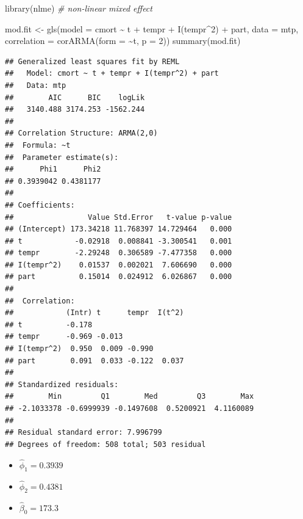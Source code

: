 \documentclass[
]{book}
\newenvironment{Shaded}{\begin{snugshade}}{\end{snugshade}}
\newcommand{\AttributeTok}[1]{\textcolor[rgb]{0.77,0.63,0.00}{#1}}
\newcommand{\CommentTok}[1]{\textcolor[rgb]{0.56,0.35,0.01}{\textit{#1}}}
\newcommand{\DecValTok}[1]{\textcolor[rgb]{0.00,0.00,0.81}{#1}}
\newcommand{\FunctionTok}[1]{\textcolor[rgb]{0.00,0.00,0.00}{#1}}
\newcommand{\NormalTok}[1]{#1}
\newcommand{\OtherTok}[1]{\textcolor[rgb]{0.56,0.35,0.01}{#1}}
\newcommand{\SpecialCharTok}[1]{\textcolor[rgb]{0.00,0.00,0.00}{#1}}
\theoremstyle{definition}
\theoremstyle{definition}
\theoremstyle{definition}
\theoremstyle{definition}
\theoremstyle{remark}
\begin{document}
\begin{Shaded}
\begin{Highlighting}[]
\FunctionTok{library}\NormalTok{(nlme)  }\CommentTok{\# non{-}linear mixed effect}

\NormalTok{mod.fit }\OtherTok{\textless{}{-}} \FunctionTok{gls}\NormalTok{(}\AttributeTok{model =}\NormalTok{ cmort }\SpecialCharTok{\textasciitilde{}}\NormalTok{ t }\SpecialCharTok{+}\NormalTok{ tempr }\SpecialCharTok{+} \FunctionTok{I}\NormalTok{(tempr}\SpecialCharTok{\^{}}\DecValTok{2}\NormalTok{) }\SpecialCharTok{+} 
\NormalTok{    part, }\AttributeTok{data =}\NormalTok{ mtp, }\AttributeTok{correlation =} \FunctionTok{corARMA}\NormalTok{(}\AttributeTok{form =} \SpecialCharTok{\textasciitilde{}}\NormalTok{t, }\AttributeTok{p =} 
    \DecValTok{2}\NormalTok{))}
\FunctionTok{summary}\NormalTok{(mod.fit)}
\end{Highlighting}
\end{Shaded}

\begin{verbatim}
## Generalized least squares fit by REML
##   Model: cmort ~ t + tempr + I(tempr^2) + part 
##   Data: mtp 
##        AIC      BIC    logLik
##   3140.488 3174.253 -1562.244
## 
## Correlation Structure: ARMA(2,0)
##  Formula: ~t 
##  Parameter estimate(s):
##      Phi1      Phi2 
## 0.3939042 0.4381177 
## 
## Coefficients:
##                 Value Std.Error   t-value p-value
## (Intercept) 173.34218 11.768397 14.729464   0.000
## t            -0.02918  0.008841 -3.300541   0.001
## tempr        -2.29248  0.306589 -7.477358   0.000
## I(tempr^2)    0.01537  0.002021  7.606690   0.000
## part          0.15014  0.024912  6.026867   0.000
## 
##  Correlation: 
##            (Intr) t      tempr  I(t^2)
## t          -0.178                     
## tempr      -0.969 -0.013              
## I(tempr^2)  0.950  0.009 -0.990       
## part        0.091  0.033 -0.122  0.037
## 
## Standardized residuals:
##        Min         Q1        Med         Q3        Max 
## -2.1033378 -0.6999939 -0.1497608  0.5200921  4.1160089 
## 
## Residual standard error: 7.996799 
## Degrees of freedom: 508 total; 503 residual
\end{verbatim}

\begin{itemize}
\item
  \(\hat \phi_1=0.3939\)
\item
  \(\hat \phi_2=0.4381\)
\item
  \(\hat \beta_0=173.3\)
\end{itemize}
\end{document}
